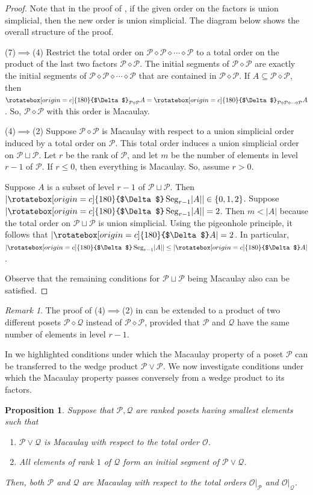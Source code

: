 \documentclass[11pt, reqno]{amsart}
\newcommand{\Q}{{\mathcal Q}}
\renewcommand{\P}{{\mathcal P}}
\newcommand{\uSdw}{\rotatebox[origin=c]{180}{$\Delta$}}
\newcommand{\di}{\diamond}
\def\Seg{\operatorname{Seg}}
\theoremstyle{plain} %
\newtheorem{prop}[thm]{Proposition}
\theoremstyle{definition}
\theoremstyle{remark}
\newtheorem{rem}[equation]{Remark}
\numberwithin{equation}{section}  %
\begin{document}
\begin{proof}
Note that in the proof of , if the given order on the factors is union simplicial, then the new order is union simplicial. The diagram below shows the overall structure of the proof.



(7)$\implies$(4) Restrict the total order on $\P\di\P\di\cdots\di\P$ to a total order on the product of the last two factors $\P\di\P$. The initial segments of $\P\di\P$ are exactly the initial segments of $\P\di\P\di\cdots\di\P$ that are contained in $\P\di\P$. If $A\subseteq\P\di\P$, then $\uSdw_{\P\di\P} A = \uSdw_{\P\di\P\di\cdots\di\P} A$. So, $\P\di\P$ with this order is Macaulay.

(4)$\implies$(2) Suppose $\P\di\P$ is Macaulay with respect to a union simplicial order induced by a total order on $\P$. This total order induces a union simplicial order on $\P\sqcup\P$. Let $r$ be the rank of $\P$, and let $m$ be the number of elements in level $r-1$ of $\P$. If $r\leq 0$, then everything is Macaulay. So, assume $r>0$.

Suppose $A$ is a subset of level $r-1$ of $\P\sqcup\P$. Then $\lvert\uSdw\Seg_{r-1}\lvert A\rvert\rvert\in\{0,1,2\}$. Suppose $\lvert\uSdw\Seg_{r-1}\lvert A\rvert\rvert = 2$. Then $m < \lvert A\rvert$ because the total order on $\P\sqcup\P$ is union simplicial. Using the pigeonhole principle, it follows that $\lvert\uSdw A\rvert = 2$.  In particular, $\lvert\uSdw\Seg_{r-1}\lvert A\rvert\rvert \leq \lvert\uSdw A\rvert$.

Observe that the remaining conditions for $\P\sqcup\P$ being Macaulay also can be satisfied.
\end{proof}

\begin{rem}
The proof of (4)$\implies$(2) in  can be extended to a product of two different posets $\P\di\mathcal{Q}$ instead of $\P\di\P$, provided that $\P$ and $\mathcal{Q}$  have the same number of elements in level $r-1$.
\end{rem}


In   we highlighted conditions under which  the Macaulay property of a poset $\P$ can be transferred to the  wedge product $\P\vee \P$. We now investigate conditions under which  the Macaulay property passes conversely from a wedge product to its factors.

\begin{prop}\label{prop: Macaulay wedge product implies Macaulay set}Suppose that $\P, \Q$ are ranked posets having smallest elements such that  
\begin{enumerate}
    \item $\P\vee \Q$ is Macaulay with respect to the total order $\mathcal{O}$.
    \item All elements of rank $1$ of $\Q$ form an initial segment of $\P\vee \Q$. 
\end{enumerate}
Then, both $\P$ and $\Q$ are Macaulay with respect to the total orders $\mathcal{O}|_\P$ and $\mathcal{O}|_\Q$.
\end{prop}
\end{document}
